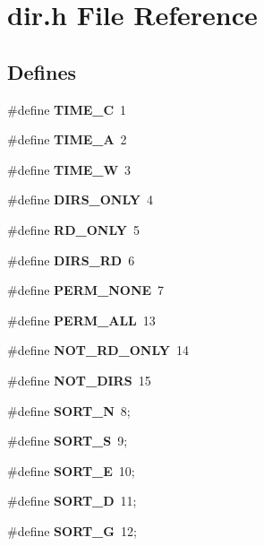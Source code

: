 \section{dir.h File Reference}
\label{dir_8h}
\subsection*{Defines}
\begin{CompactItemize}
\item 
\#define {\bf TIME\_\-C}~1\label{dir_8h_59c9f23a58a43eba5b53da974d2eb0f6}

\item 
\#define {\bf TIME\_\-A}~2\label{dir_8h_f3446ee0eca6a4a6f4d6f54223948267}

\item 
\#define {\bf TIME\_\-W}~3\label{dir_8h_8b6b1dd6d1c296eb659c2559b9c60361}

\item 
\#define {\bf DIRS\_\-ONLY}~4\label{dir_8h_e918579168b8ff88c0e2661477940bc2}

\item 
\#define {\bf RD\_\-ONLY}~5\label{dir_8h_6d7dddcf51acb8c09bde911284b3b7fc}

\item 
\#define {\bf DIRS\_\-RD}~6\label{dir_8h_aaa76a8ede2de15a5998a1ceea79d27c}

\item 
\#define {\bf PERM\_\-NONE}~7\label{dir_8h_ca8351770ad21d2a65db52aff429f09d}

\item 
\#define {\bf PERM\_\-ALL}~13\label{dir_8h_4331309f3d0d1016c5c640c7d9aa40e2}

\item 
\#define {\bf NOT\_\-RD\_\-ONLY}~14\label{dir_8h_f41b2ff6ab562d87ea14a05ee4ed433a}

\item 
\#define {\bf NOT\_\-DIRS}~15\label{dir_8h_ad2530eab4c554cce6db4926f033aa46}

\item 
\#define {\bf SORT\_\-N}~8;\label{dir_8h_f7808dda2d13a97e1aaeeff98ea933f9}

\item 
\#define {\bf SORT\_\-S}~9;\label{dir_8h_e2dfa3c2127e9e9059b24ac52cd2fbbd}

\item 
\#define {\bf SORT\_\-E}~10;\label{dir_8h_9de7b8ce82beaeadcc52b2886b5e500a}

\item 
\#define {\bf SORT\_\-D}~11;\label{dir_8h_c5ce395495aad5bba6e21611fe06f5e3}

\item 
\#define {\bf SORT\_\-G}~12;\label{dir_8h_c259000a27aec8f7d566211a872af955}

\end{CompactItemize}
